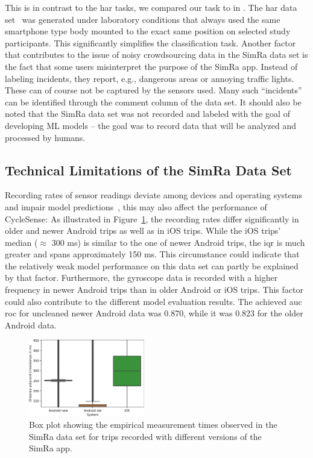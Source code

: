 This is in contrast to the \ac{har} tasks, we compared our task to in .
The \ac{har} data set~\cite{anguita2013public} was generated under laboratory conditions that always used the same smartphone type body mounted to the exact same position on selected study participants.
This significantly simplifies the classification task.
Another factor that contributes to the issue of noisy crowdsourcing data in the SimRa data set is the fact that some users misinterpret the purpose of the SimRa app.
Instead of labeling incidents, they report, e.g., dangerous areas or annoying traffic lights.
These can of course not be captured by the sensors used.
Many such ``incidents'' can be identified through the comment column of the data set.
It should also be noted that the SimRa data set was not recorded and labeled with the goal of developing ML models -- the goal was to record data that will be analyzed and processed by humans.

\subsection{Technical Limitations of the SimRa Data Set}
\label{subsec:technical_limitations_of_the_simra_data_set}
Recording rates of sensor readings deviate among devices and operating systems and impair model predictions~\cite{stisen2015smart}, this may also affect the performance of CycleSense:
As illustrated in Figure~\ref{fig:emp-measurements}, the recording rates differ significantly in older and newer Android trips as well as in iOS trips.
While the iOS trips' median ($\approx$ 300 ms) is similar to the one of newer Android trips, the \ac{iqr} is much greater and spans approximately 150 ms.
This circumstance could indicate that the relatively weak model performance on this data set can partly be explained by that factor.
Furthermore, the gyroscope data is recorded with a higher frequency in newer Android trips than in older Android or iOS trips.
This factor could also contribute to the different model evaluation results.
The achieved \ac{auc} \ac{roc} for uncleaned newer Android data was 0.870, while it was 0.823 for the older Android data.

\begin{figure}[t]
	\centering
	\includegraphics[width=0.45\textwidth]{fig/empirical_measurements.png}
	\caption{Box plot showing the empirical measurement times observed in the SimRa data set for trips recorded with different versions of the SimRa app.}
	\label{fig:emp-measurements}
\end{figure}

